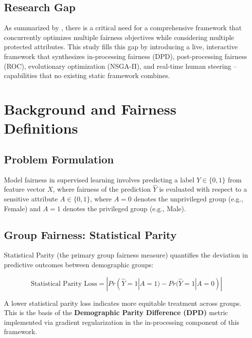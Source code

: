\documentclass[12pt,a4paper]{article}
\begin{document}
\subsection{Research Gap}

As summarized by \cite{rN2024multiobj}, there is a critical need for a comprehensive framework that concurrently optimizes multiple fairness objectives while considering multiple protected attributes. This study fills this gap by introducing a live, interactive framework that synthesizes in-processing fairness (DPD), post-processing fairness (ROC), evolutionary optimization (NSGA-II), and real-time human steering -- capabilities that no existing static framework combines.

\section{Background and Fairness Definitions}

\subsection{Problem Formulation}

Model fairness in supervised learning involves predicting a label $Y \in \{0, 1\}$ from feature vector $X$, where fairness of the prediction $\hat{Y}$ is evaluated with respect to a sensitive attribute $A \in \{0, 1\}$, where $A=0$ denotes the unprivileged group (e.g., Female) and $A=1$ denotes the privileged group (e.g., Male).

\subsection{Group Fairness: Statistical Parity}

Statistical Parity (the primary group fairness measure) quantifies the deviation in predictive outcomes between demographic groups:

\begin{equation}
    \text{Statistical Parity Loss} = |Pr(\hat{Y}=1 | A=1) - Pr(\hat{Y}=1 | A=0)|
\end{equation}

A lower statistical parity loss indicates more equitable treatment across groups. This is the basis of the \textbf{Demographic Parity Difference (DPD)} metric implemented via gradient regularization in the in-processing component of this framework.
\end{document}
